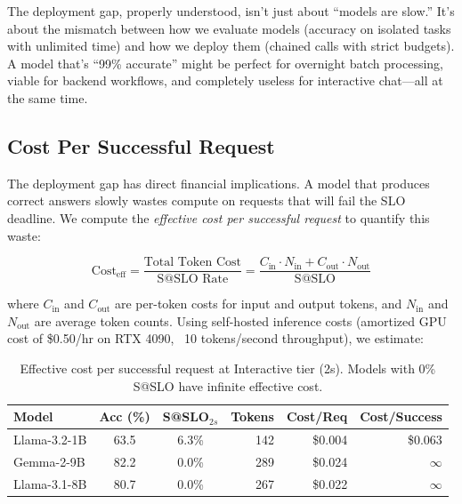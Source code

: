 \documentclass[11pt]{article}
\begin{document}
The deployment gap, properly understood, isn't just about ``models are slow.''
It's about the mismatch between how we evaluate models (accuracy on isolated tasks with unlimited time) and how we deploy them (chained calls with strict budgets).
A model that's ``99\% accurate'' might be perfect for overnight batch processing, viable for backend workflows, and completely useless for interactive chat---all at the same time.

\subsection{Cost Per Successful Request}
\label{sec:cost-analysis}

The deployment gap has direct financial implications. A model that produces correct answers slowly wastes compute on requests that will fail the SLO deadline. We compute the \emph{effective cost per successful request} to quantify this waste:

\begin{equation}
\text{Cost}_{\text{eff}} = \frac{\text{Total Token Cost}}{\text{S@SLO Rate}} = \frac{C_{\text{in}} \cdot N_{\text{in}} + C_{\text{out}} \cdot N_{\text{out}}}{\text{S@SLO}}
\end{equation}

where $C_{\text{in}}$ and $C_{\text{out}}$ are per-token costs for input and output tokens, and $N_{\text{in}}$ and $N_{\text{out}}$ are average token counts. Using self-hosted inference costs (amortized GPU cost of \$0.50/hr on RTX 4090, ~10 tokens/second throughput), we estimate:

\begin{table}[h]
\centering
\small
\caption{Effective cost per successful request at Interactive tier (2s). Models with 0\% S@SLO have infinite effective cost.}
\label{tab:cost-analysis}
\begin{tabular}{lcc rr r}
\toprule
\textbf{Model} & \textbf{Acc (\%)} & \textbf{S@SLO$_{2s}$} & \textbf{Tokens} & \textbf{Cost/Req} & \textbf{Cost/Success} \\
\midrule
Llama-3.2-1B    & 63.5 & 6.3\% & 142 & \$0.004 & \$0.063 \\
Gemma-2-9B      & 82.2 & 0.0\% & 289 & \$0.024 & $\infty$ \\
Llama-3.1-8B    & 80.7 & 0.0\% & 267 & \$0.022 & $\infty$ \\
\bottomrule
\end{tabular}
\end{table}
\end{document}
